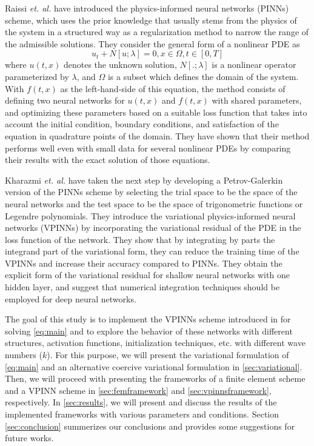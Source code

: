 Raissi \textit{et. al.} \cite{RAISSI2019686} have introduced the physics-informed neural networks (PINNs) scheme, which uses the prior knowledge that usually stems from the physics of the system in a structured way as a regularization method to narrow the range of the admissible solutions. They consider the general form of a nonlinear PDE as
\begin{equation}
    u_t + N[u; \lambda] = 0, x \in \Omega, t \in [0, T]
\end{equation}
where $u(t, x)$ denotes the unknown solution, $N[.; \lambda]$ is a nonlinear operator parameterized by $\lambda$, and $\Omega$ is a subset which defines the domain of the system. With $f(t, x)$ as the left-hand-side of this equation, the method consists of defining two neural networks for $u(t, x)$ and $f(t, x)$ with shared parameters, and optimizing these parameters based on a suitable loss function that takes into account the initial condition, boundary conditions, and satisfaction of the equation in quadrature points of the domain. They have shown that their method performs well even with small data for several nonlinear PDEs by comparing their results with the exact solution of those equations.

Kharazmi \textit{et. al.} \cite{kharazmi2019variational} have taken the next step by developing a Petrov-Galerkin version of the PINNs scheme by selecting the trial space to be the space of the neural networks and the test space to be the space of trigonometric functions or Legendre polynomials. They introduce the variational physics-informed neural networks (VPINNs) by incorporating the variational residual of the PDE in the loss function of the network. They show that by integrating by parts the integrand part of the variational form, they can reduce the training time of the VPINNs and increase their accuracy compared to PINNs. They obtain the explicit form of the variational residual for shallow neural networks with one hidden layer, and suggest that numerical integration techniques should be employed for deep neural
networks.

The goal of this study is to implement the VPINNs scheme introduced in \cite{kharazmi2019variational} for solving \autoref{eq:main} and to explore the behavior of these networks with different structures, activation functions, initialization techniques, etc. with different wave numbers ($k$). For this purpose, we will present the variational formulation of \autoref{eq:main} and an alternative coercive variational formulation in \autoref{sec:variational}. Then, we will proceed with presenting the frameworks of a finite element scheme and a VPINN scheme in \autoref{sec:femframework} and \autoref{sec:vpinnsframework}, respectively. In \autoref{sec:results}, we will present and discuss the results of the implemented frameworks with various parameters and conditions. Section \ref{sec:conclusion} summerizes our conclusions and provides some suggestions for future works.

